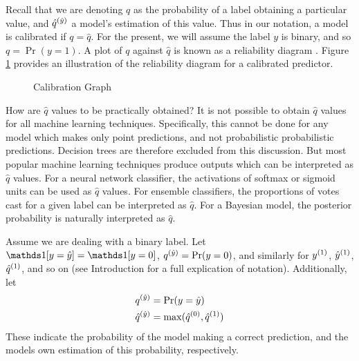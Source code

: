 Recall that we are denoting $q$ as the probability of a label obtaining a particular value, and $\qhatyhat$ a model's estimation of this value. Thus in our notation, a model is calibrated if $q=\hat{q}$. For the present, we will assume the label $y$ is binary, and so $q=\Pr(y=1)$. A plot of $q$ against $\hat{q}$ is known as a reliability diagram \cite{calibrating}. Figure \ref{fig:calibration} provides an illustration of the reliability diagram for a calibrated predictor.

\newcommand{\calibrationgraph}[7][]{
    \draw [thick, <->] (0,1.25) -- (0,0) -- (1.25,0);
    \node [below] at (1.25,0) {$\hat{q}$};
    14
    \node [left] at (0,1.25) {$q$};
    \node [left] at (0,#7) {$\Pr(y_t=\hat{y}_t)$};
    \node [below] at (#6,0) {$\hat{q}_t$};
    \draw (#2,#3) -- (#4,#5);
    \draw [red] (#6,0) -- (#6,#7);
    \draw [red, dashed] (0,#7) -- (#6,#7);
}

\begin{figure}
    \centering
    \caption{Calibration Graph}
    \label{fig:calibration}
\end{figure}

How are $\hat{q}$ values to be practically obtained? It is not possible to obtain $\hat{q}$ values for all machine learning techniques. Specifically, this cannot be done for any model which makes only point predictions, and not probabilistic probabilistic predictions. Decision trees are therefore excluded from this discussion. But most popular machine learning techniques produce outputs which can be interpreted as $\hat{q}$ values. For a neural network classifier, the activations of softmax or sigmoid units can be used as $\hat{q}$ values. For ensemble classifiers, the proportions of votes cast for a given label can be interpreted as $\hat{q}$. For a Bayesian model, the posterior probability is naturally interpreted as $\hat{q}$.

Assume we are dealing with a binary label. Let $\id{y=\hat{y}}=\id{y=0}$, $\qyhat=\Pr(y=0)$, and similarly for $y^{(1)}$, $\hat{y}^{(1)}$, $\hat{q}^{(1)}$, and so on (see Introduction for a full explication of notation). Additionally, let
\newcommand{\qyhat}{\q{\hat{y}}}
\newcommand{\qhatyhat}{\qhat{\hat{y}}}
\begin{align}
    \qyhat &= \Pr(y=\hat{y}) \\
    \qhatyhat &= \max(\qhat{0},\qhat{1})
\end{align}
These indicate the probability of the model making a correct prediction, and the models own estimation of this probability, respectively. 


